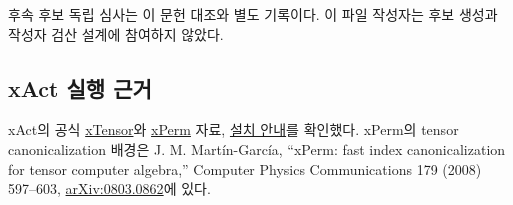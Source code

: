 \documentclass[11pt,a4paper]{article}
\begin{document}
후속 후보 독립 심사는 이 문헌 대조와 별도 기록이다. 이 파일 작성자는 후보 생성과 작성자 검산 설계에 참여하지 않았다.

\endgroup

\hypertarget{xact-uxc2e4uxd589-uxadfcuxac70}{%
\subsection{xAct 실행 근거}\label{xact-uxc2e4uxd589-uxadfcuxac70}}

xAct의 공식 \href{https://www.xact.es/xTensor/}{xTensor}와 \href{https://www.xact.es/xPerm/}{xPerm} 자료, \href{https://www.xact.es/download/install}{설치 안내}를 확인했다. xPerm의 tensor canonicalization 배경은 J. M. Martín-García, ``xPerm: fast index canonicalization for tensor computer algebra,'' Computer Physics Communications 179 (2008) 597--603, \href{https://arxiv.org/abs/0803.0862}{arXiv:0803.0862}에 있다.
\end{document}
